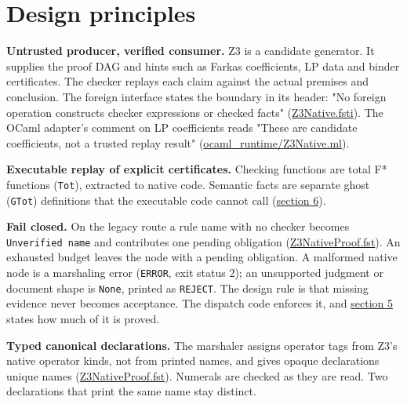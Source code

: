 \documentclass[10pt,a4paper]{article}
\begin{document}
\section{Design principles}\label{sec:2-design-principles}

\textbf{Untrusted producer, verified consumer.} Z3 is a candidate generator. It supplies the proof DAG and hints such as Farkas coefficients, LP data and binder certificates. The checker replays each claim against the actual premises and conclusion. The foreign interface states the boundary in its header: "No foreign operation constructs checker expressions or checked facts" (\href{https://github.com/Z3Prover/z3/blob/8fbb275aba0472e862e289c7af1331b3bd5d512c/fstar/Z3Native.fsti\#L1-L2}{Z3Native.\allowbreak{}fsti}). The OCaml adapter's comment on LP coefficients reads "These are candidate coefficients, not a trusted replay result" (\href{https://github.com/Z3Prover/z3/blob/8fbb275aba0472e862e289c7af1331b3bd5d512c/fstar/ocaml_runtime/Z3Native.ml\#L445-L448}{ocaml\_\allowbreak{}runtime/\allowbreak{}Z3Native.\allowbreak{}ml}).

\textbf{Executable replay of explicit certificates.} Checking functions are total F* functions (\texttt{Tot}), extracted to native code. Semantic facts are separate ghost (\texttt{GTot}) definitions that the executable code cannot call (\hyperref[sec:6-extraction-runtime-and-build]{section 6}).

\textbf{Fail closed.} On the legacy route a rule name with no checker becomes \texttt{Unverified name} and contributes one pending obligation (\href{https://github.com/Z3Prover/z3/blob/8fbb275aba0472e862e289c7af1331b3bd5d512c/fstar/Z3NativeProof.fst\#L227-L244}{Z3Native\allowbreak{}Proof.\allowbreak{}fst}). An exhausted budget leaves the node with a pending obligation. A malformed native node is a marshaling error (\texttt{ERROR}, exit status 2); an unsupported judgment or document shape is \texttt{None}, printed as \texttt{REJECT}. The design rule is that missing evidence never becomes acceptance. The dispatch code enforces it, and \hyperref[sec:5-formal-assurance]{section 5} states how much of it is proved.

\textbf{Typed canonical declarations.} The marshaler assigns operator tags from Z3's native operator kinds, not from printed names, and gives opaque declarations unique names (\href{https://github.com/Z3Prover/z3/blob/8fbb275aba0472e862e289c7af1331b3bd5d512c/fstar/Z3NativeProof.fst\#L78-L138}{Z3Native\allowbreak{}Proof.\allowbreak{}fst}). Numerals are checked as they are read. Two declarations that print the same name stay distinct.
\end{document}
